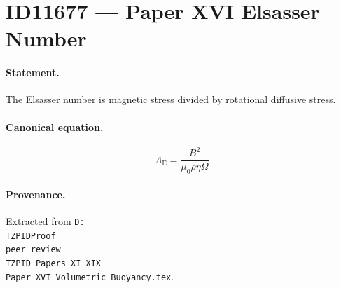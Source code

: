 \section*{ID11677 --- Paper XVI Elsasser Number}

\paragraph{Statement.}
The Elsasser number is magnetic stress divided by rotational diffusive stress.

\paragraph{Canonical equation.}
\[
\Lambda_{\mathrm{E}}=\frac{B^2}{\mu_0\rho\eta\Omega}
\]

\paragraph{Provenance.}
Extracted from \texttt{D:\\TZPIDProof\\peer\_review\\TZPID\_Papers\_XI\_XIX\\Paper\_XVI\_Volumetric\_Buoyancy.tex}.
